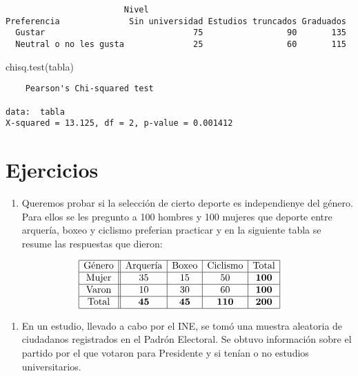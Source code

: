 \documentclass[
  a4paper,
  oneside,
  openany]{book}
\newenvironment{Shaded}{\begin{snugshade}}{\end{snugshade}}
\newcommand{\FunctionTok}[1]{\textcolor[rgb]{0.00,0.00,0.00}{#1}}
\newcommand{\NormalTok}[1]{#1}
\providecommand{\tightlist}{%
  \setlength{\itemsep}{0pt}\setlength{\parskip}{0pt}}
\begin{document}
\begin{verbatim}
                        Nivel
Preferencia              Sin universidad Estudios truncados Graduados
  Gustar                              75                 90       135
  Neutral o no les gusta              25                 60       115
\end{verbatim}

\begin{Shaded}
\begin{Highlighting}[]
\FunctionTok{chisq.test}\NormalTok{(tabla)}
\end{Highlighting}
\end{Shaded}

\begin{verbatim}
    Pearson's Chi-squared test

data:  tabla
X-squared = 13.125, df = 2, p-value = 0.001412
\end{verbatim}

\hypertarget{ejercicios-8}{%
\section{Ejercicios}\label{ejercicios-8}}

\begin{enumerate}
\def\labelenumi{\arabic{enumi}.}
\tightlist
\item
  Queremos probar si la selección de cierto deporte es independienye del género. Para ellos se les pregunto a 100 hombres y 100 mujeres que deporte entre arquería, boxeo y ciclismo preferian practicar y en la siguiente tabla se resume las respuestas que dieron:
\end{enumerate}

\[
\begin{array}{|c ||c |c |c|c|}
\hline 
\mbox{Género} & \mbox{Arquería}&\mbox{Boxeo} &\mbox{Ciclismo}& \mbox{Total} \\
\hline 
\mbox{Mujer} & 35 &  15 & 50&\textbf{100}\\
 \hline 
\mbox{Varon}& 10 & 30 &60&\textbf{100}\\ 
\hline 
\mbox{Total}&\textbf{45}&\textbf{45}&\textbf{110}&\textbf{200}\\
\hline 
\end{array}
\]

\begin{enumerate}
\def\labelenumi{\arabic{enumi}.}
\setcounter{enumi}{1}
\tightlist
\item
  En un estudio, llevado a cabo por el INE, se tomó una muestra aleatoria de ciudadanos registrados en el Padrón Electoral. Se obtuvo información sobre el partido por el que votaron para Presidente y si tenían o no estudios universitarios.
\end{enumerate}
\end{document}
